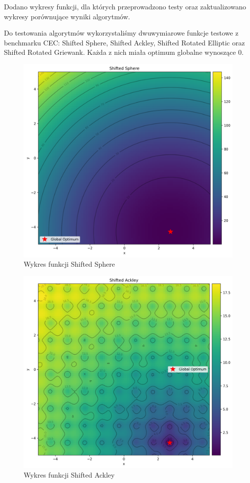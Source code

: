 \documentclass{article}
\begin{document}
Dodano wykresy funkcji, dla których przeprowadzono testy oraz zaktualizowano wykresy porównujące wyniki algorytmów.

Do testowania algorytmów wykorzystaliśmy dwuwymiarowe funkcje testowe z benchmarku CEC: Shifted Sphere, Shifted Ackley, Shifted Rotated Elliptic oraz Shifted Rotated Griewank. Każda z nich miała optimum globalne wynoszące 0.

\begin{figure}[H]
    \centering
    \includegraphics[width=\textwidth]{shifted_sphere.png}
    \caption{Wykres funkcji Shifted Sphere}
    \label{fig:plot1}
\end{figure}

\begin{figure}[H]
    \centering
    \includegraphics[width=\textwidth]{shifted_ackley.png}
    \caption{Wykres funkcji Shifted Ackley}
    \label{fig:plot2}
\end{figure}
\end{document}
